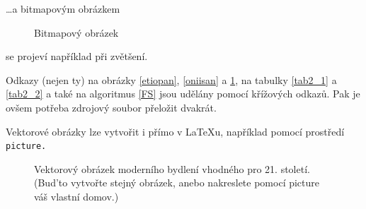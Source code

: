 \documentclass[a4paper, 11pt]{article}
\begin{document}
\dots a bitmapovým obrázkem

\begin{figure}[h]
    \centering
    \caption{Bitmapový obrázek}
    \label{oniisan2}
\end{figure}

\noindent
se projeví například při zvětšení. \par
Odkazy (nejen ty) na obrázky \ref{etiopan}, \ref{oniisan} a \ref{oniisan2}, na tabulky \ref{tab2_1} a \ref{tab2_2} a také na algoritmus \ref{FS} jsou udělány pomocí křížových odkazů. Pak je ovšem potřeba zdrojový soubor přeložit dvakrát. \par
Vektorové obrázky lze vytvořit i přímo v \LaTeX{u}, například pomocí prostředí \texttt{picture.}

\newpage

\begin{landscape}
    \begin{figure}[ht]
        \centering
        \setlength{\unitlength}{1mm}
    \caption{Vektorový obrázek moderního bydlení vhodného pro 21. století. (Bud’to vytvořte stejný obrázek, anebo nakreslete pomocí picture váš vlastní domov.)}
    \end{figure}
\end{landscape}
\end{document}
